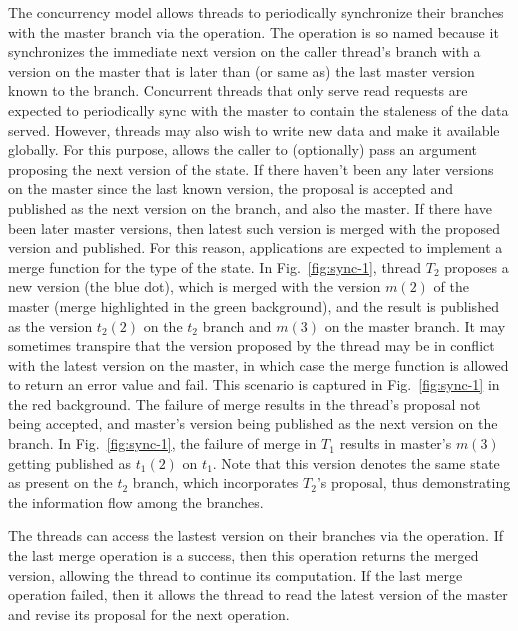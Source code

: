 The concurrency model allows threads to periodically synchronize their
branches with the master branch via the 
operation. The operation is so named because it synchronizes the
immediate next version on the caller thread's branch with a version on
the master that is later than (or same as) the last master version
known to the branch. Concurrent threads that only serve read requests
are expected to periodically sync with the master to contain the
staleness of the data served. However, threads may also wish to
write new data and make it available globally. For this purpose,
 allows the caller to (optionally) pass an
argument proposing the next version of the state. If there haven't
been any later versions on the master since the last known version,
the proposal is accepted and published as the next version on the
branch, and also the master. If there have been later master versions,
then latest such version is merged with the proposed version and
published. For this reason, applications are expected to implement a
merge function for the type of the state. In Fig.~\ref{fig:sync-1},
thread $T_2$ proposes a new version (the blue dot), which is merged
with the version $m(2)$ of the master (merge highlighted in the green
background), and the result is published as the version $t_2(2)$ on
the $t_2$ branch and $m(3)$ on the master branch. It may sometimes
transpire that the version proposed by the thread may be in conflict
with the latest version on the master, in which case the merge
function is allowed to return an error value and fail. This scenario
is captured in Fig.~\ref{fig:sync-1} in the red background. The
failure of merge results in the thread's proposal not being accepted,
and master's version being published as the next version on the
branch. In Fig.~\ref{fig:sync-1}, the failure of merge in $T_1$
results in master's $m(3)$ getting published as $t_1(2)$ on $t_1$.
Note that this version denotes the same state as present on the $t_2$
branch, which incorporates $T_2$'s proposal, thus demonstrating the
information flow among the branches.

The threads can access the lastest version on their branches via the
 operation. If the last merge operation is a
success, then this operation returns the merged version, allowing the
thread to continue its computation. If the last merge operation
failed, then it allows the thread to read the latest version of the 
master and revise its proposal for the next  operation. 

